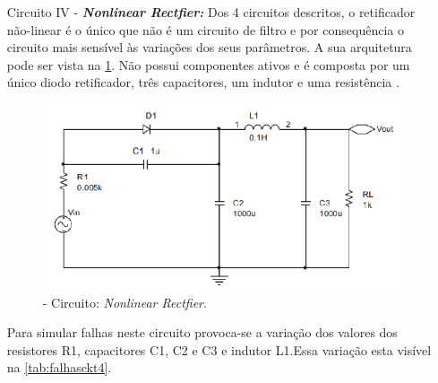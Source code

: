 \begin{enumerate}
\item[Circuito IV - ]\textbf{\textit{ Nonlinear Rectfier:}} Dos 4 circuitos descritos, o retificador não-linear é o único que não é um circuito de filtro e por consequência o circuito mais sensível às variações dos seus parâmetros. A sua arquitetura pode ser vista na \ref{fig:Circuito4}. Não possui componentes ativos e é composta por um único diodo retificador, três capacitores, um indutor e uma resistência \cite{Clayton}.

\begin{figure}[H]
\begin{center}
\includegraphics[width=12cm]{./04_Cap4/figures/retificadorckt.png}
\caption{\label{fig:Circuito4}- Circuito:{\textit{ Nonlinear Rectfier}.}}
\end{center}
\end{figure}
Para simular falhas neste circuito provoca-se a variação dos valores dos resistores R1, capacitores C1, C2 e C3 e indutor L1.Essa variação esta visível na \ref{tab:falhasckt4}.


\end{enumerate}
